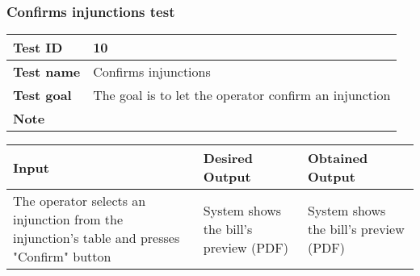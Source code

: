 {{		\subsubsection{Confirms injunctions test}{
			\begin{table}[h]
			\begin{tabular}{|p{4cm}|p{10cm}|}
			\hline
				\centering \vspace{1mm} \bfseries{Test ID} \vspace{1mm} & 
				\vspace{1mm} 10 \vspace{1mm}\\
			\hline
				\centering \vspace{1mm} \bfseries{Test name} \vspace{1mm} & 
				\vspace{1mm} Confirms injunctions \vspace{1mm}\\
			\hline
				\centering \vspace{1mm} \bfseries{Test goal} \vspace{1mm} & 
				\vspace{1mm} The goal is to let the operator confirm an injunction\vspace{1mm}\\
			\hline
				\centering \vspace{1mm} \bfseries{Note} \vspace{1mm} & 
				\vspace{1mm}  \vspace{1mm}\\
			\hline
			\end{tabular}
			\end{table}

			\begin{table}[h]
			\begin{tabular}{|p{4cm}|p{5cm}|p{5cm}|}
			\hline
			\centering \vspace{1mm} \bfseries{Input} \vspace{1mm} & \vspace{1mm} \bfseries{Desired Output} \vspace{1mm} & \vspace{1mm} \bfseries{Obtained Output} \vspace{1mm}\\
			\hline
				\vspace{1mm} The operator selects an injunction from the injunction's table and presses "Confirm" button \vspace{1mm} &
				\vspace{1mm} System shows the bill's preview (PDF) \vspace{1mm} & 
				\vspace{1mm} System shows the bill's preview (PDF) \vspace{1mm} \\
			\hline
			\end{tabular}
			\end{table}
		}
		\clearpage

}}
